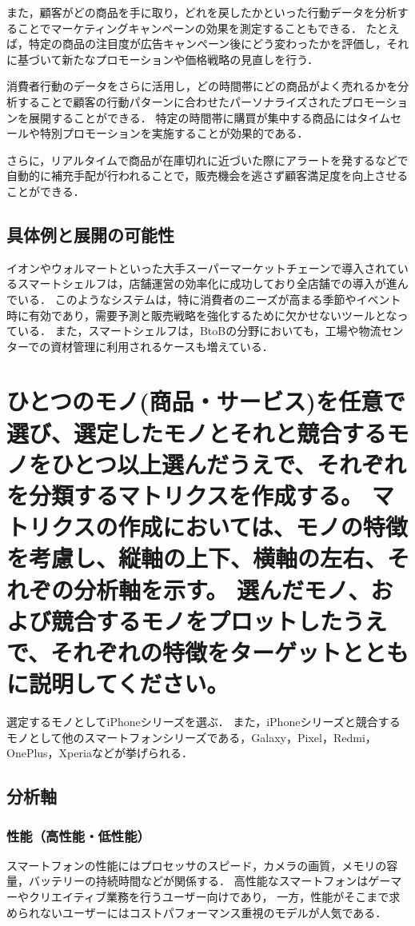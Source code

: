 \documentclass[titlepage,a4paper]{jsarticle}
\begin{document}
また，顧客がどの商品を手に取り，どれを戻したかといった行動データを分析することでマーケティングキャンペーンの効果を測定することもできる．
たとえば，特定の商品の注目度が広告キャンペーン後にどう変わったかを評価し，それに基づいて新たなプロモーションや価格戦略の見直しを行う．

消費者行動のデータをさらに活用し，どの時間帯にどの商品がよく売れるかを分析することで顧客の行動パターンに合わせたパーソナライズされたプロモーションを展開することができる．
特定の時間帯に購買が集中する商品にはタイムセールや特別プロモーションを実施することが効果的である．

さらに，リアルタイムで商品が在庫切れに近づいた際にアラートを発するなどで自動的に補充手配が行われることで，販売機会を逃さず顧客満足度を向上させることができる．

\subsection{具体例と展開の可能性}
イオンやウォルマートといった大手スーパーマーケットチェーンで導入されているスマートシェルフは，店舗運営の効率化に成功しており全店舗での導入が進んでいる．
このようなシステムは，特に消費者のニーズが高まる季節やイベント時に有効であり，需要予測と販売戦略を強化するために欠かせないツールとなっている．
また，スマートシェルフは，BtoBの分野においても，工場や物流センターでの資材管理に利用されるケースも増えている．

\section{ひとつのモノ(商品・サービス)を任意で選び、選定したモノとそれと競合するモノをひとつ以上選んだうえで、それぞれを分類するマトリクスを作成する。
  マトリクスの作成においては、モノの特徴を考慮し、縦軸の上下、横軸の左右、それぞの分析軸を示す。
  選んだモノ、および競合するモノをプロットしたうえで、それぞれの特徴をターゲットとともに説明してください。}%
選定するモノとしてiPhoneシリーズを選ぶ．
また，iPhoneシリーズと競合するモノとして他のスマートフォンシリーズである，Galaxy，Pixel，Redmi，OnePlus，Xperiaなどが挙げられる．
\subsection{分析軸}
\subsubsection{性能（高性能・低性能）}
スマートフォンの性能にはプロセッサのスピード，カメラの画質，メモリの容量，バッテリーの持続時間などが関係する．
高性能なスマートフォンはゲーマーやクリエイティブ業務を行うユーザー向けであり，
一方，性能がそこまで求められないユーザーにはコストパフォーマンス重視のモデルが人気である．
\end{document}
